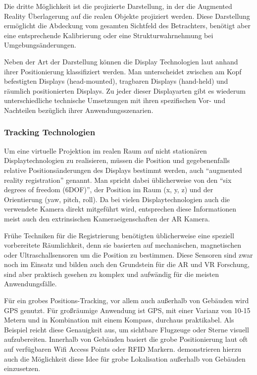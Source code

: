 Die dritte Möglichkeit ist die projizierte Darstellung, in der die Augmented Reality Überlagerung auf die realen Objekte projiziert werden. Diese Darstellung ermöglicht die Abdeckung vom gesamten Sichtfeld des Betrachters, benötigt aber eine entsprechende Kalibrierung oder eine Strukturwahrnehmung bei Umgebungsänderungen.

Neben der Art der Darstellung können die Display Technologien laut \citet{azuma2001recent} anhand ihrer Positionierung klassifiziert werden. Man unterscheidet zwischen am Kopf befestigten Displays (head-mounted), tragbaren Displays (hand-held) und räumlich positionierten Displays. Zu jeder dieser Displayarten gibt es wiederum unterschiedliche technische Umsetzungen mit ihren spezifischen Vor- und Nachteilen bezüglich ihrer Anwendungsszenarien.

\subsubsection{Tracking Technologien}

Um eine virtuelle Projektion im realen Raum auf nicht stationären Displaytechnologien zu realisieren, müssen die Position und gegebenenfalls relative Positionsänderungen des Displays bestimmt werden, auch \enquote{augmented reality registration} genannt. Man spricht dabei üblicherweise von den \enquote{six degrees of freedom (6DOF)}, der Position im Raum (x, y, z) und der Orientierung (yaw, pitch, roll). Da bei vielen Displaytechnologien auch die verwendete Kamera direkt mitgeführt wird, entsprechen diese Informationen meist auch den extrinsischen Kameraeigenschaften der AR Kamera.

Frühe Techniken für die Registrierung benötigten üblicherweise eine speziell vorbereitete Räumlichkeit, denn sie basierten auf mechanischen, magnetischen oder Ultraschallsensoren um die Position zu bestimmen. Diese Sensoren sind zwar noch im Einsatz und bilden auch den Grundstein für die AR und VR Forschung, sind aber praktisch gesehen zu komplex und aufwändig für die meisten Anwendungsfälle. \citep{van2010survey} 

Für ein grobes Positions-Tracking, vor allem auch außerhalb von Gebäuden wird GPS genutzt. Für großräumige Anwendung ist GPS, mit einer Varianz von 10-15 Metern und in Kombination mit einem Kompass, durchaus praktikabel. Als Beispiel reicht diese Genauigkeit aus, um sichtbare Flugzeuge oder Sterne visuell aufzubereiten. Innerhalb von Gebäuden basiert die grobe Positionierung laut \citet{van2010survey} oft auf verfügbaren Wifi Access Points oder RFID Markern. \citet{lamarca2005place} demonstrieren hierzu auch die Möglichkeit diese Idee für grobe Lokalisation außerhalb von Gebäuden einzusetzen.


